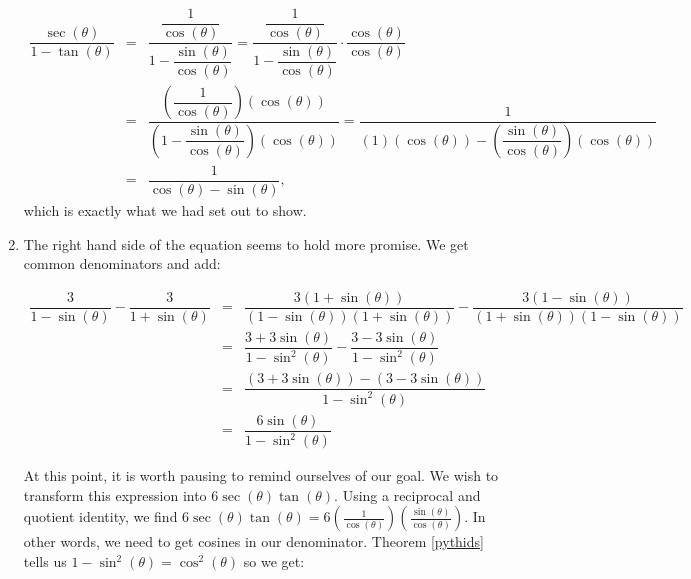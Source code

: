 \begin{ex}
\begin{enumerate}
\[ \begin{array}{rcl} \dfrac{\sec(\theta)}{1 - \tan(\theta)} & = & \dfrac{ \dfrac{1}{\cos(\theta)}}{1 - \dfrac{\sin(\theta)}{\cos(\theta)}} = \dfrac{ \dfrac{1}{\cos(\theta)}}{1 - \dfrac{\sin(\theta)}{\cos(\theta)}} \cdot \dfrac{\cos(\theta)}{\cos(\theta)} \\ [.4in]
 & = & \dfrac{\left( \dfrac{1}{\cos(\theta)} \right) ( \cos(\theta) )}{\left(1 - \dfrac{\sin(\theta)}{\cos(\theta)}\right)(\cos(\theta))} = \dfrac{1}{(1)(\cos(\theta)) - \left(\dfrac{\sin(\theta)}{\cos(\theta)}\right)(\cos(\theta))} \\ [.4in]
                                                           & = & \dfrac{1}{\cos(\theta) - \sin(\theta)}, \end{array} \]
which is exactly what we had set out to show.  

\item  The right hand side of the equation seems to hold more promise.  We get common denominators and add:

\[ \begin{array}{rcl}

\dfrac{3}{1-\sin(\theta)} - \dfrac{3}{1 + \sin(\theta)} & = & \dfrac{3(1 + \sin(\theta))}{(1-\sin(\theta))(1 + \sin(\theta))} - \dfrac{3(1-\sin(\theta))}{(1 + \sin(\theta))(1-\sin(\theta))} \\ [.25in]
                                                        & = & \dfrac{3 + 3\sin(\theta)}{1 - \sin^{2}(\theta)} - \dfrac{3 - 3\sin(\theta)}{1 - \sin^{2}(\theta)} \\ [.25in]
                                                        & = & \dfrac{(3 + 3\sin(\theta)) - (3 - 3\sin(\theta))}{1 - \sin^{2}(\theta)} \\ [.25in]                                                        																																	& = & \dfrac{6 \sin(\theta)}{1 - \sin^{2}(\theta)} \end{array} \]

At this point, it is worth pausing to remind ourselves of our goal.  We wish to transform this expression into $6\sec(\theta) \tan(\theta)$.  Using a reciprocal and quotient identity, we find $6\sec(\theta) \tan(\theta) = 6 \left(\frac{1}{\cos(\theta)}\right) \left(\frac{\sin(\theta)}{\cos(\theta)}\right)$.  In other words, we need to get cosines in our denominator. Theorem \ref{pythids} tells us $1 -  \sin^{2}(\theta) = \cos^{2}(\theta)$ so we get:

\[ \begin{array}{rcl}


\end{array}\]
\end{enumerate}
\end{ex}
